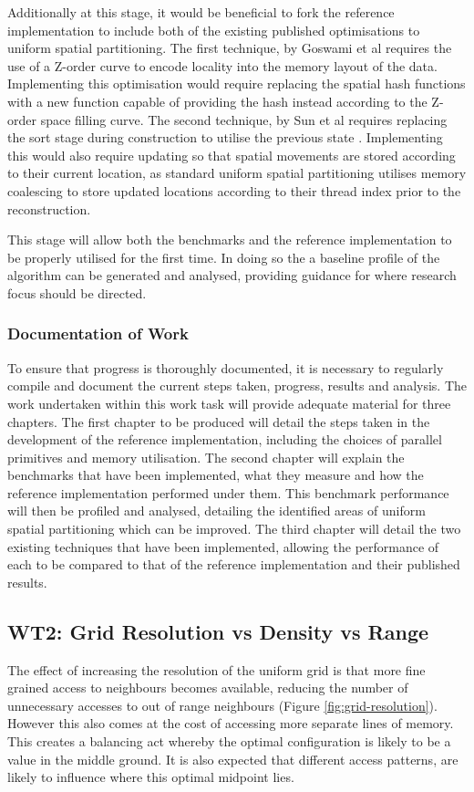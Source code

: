         Additionally at this stage, it would be beneficial to fork the reference implementation to include both of the existing published optimisations to uniform spatial partitioning. The first technique, by Goswami et al requires the use of a Z-order curve to encode locality into the memory layout of the data\cite{GS*10}. Implementing this optimisation would require replacing the spatial hash functions with a new function capable of providing the hash instead according to the Z-order space filling curve. The second technique, by Sun et al requires replacing the sort stage during construction to utilise the previous state \cite{HY*15}. Implementing this would also require updating so that spatial movements are stored according to their current location, as standard uniform spatial partitioning utilises memory coalescing to store updated locations according to their thread index prior to the reconstruction.
        
        This stage will allow both the benchmarks and the reference implementation to be properly utilised for the first time. In doing so the a baseline profile of the algorithm can be generated and analysed, providing guidance for where research focus should be directed.      
      
      \subsubsection*{Documentation of Work}
        To ensure that progress is thoroughly documented, it is necessary to regularly compile and document the current steps taken, progress, results and analysis. The work undertaken within this work task will provide adequate material for three chapters. The first chapter to be produced will detail the steps taken in the development of the reference implementation, including the choices of parallel primitives and memory utilisation. The second chapter will explain the benchmarks that have been implemented, what they measure and how the reference implementation performed under them. This benchmark performance will then be profiled and analysed, detailing the identified areas of uniform spatial partitioning which can be improved. The third chapter will detail the two existing techniques that have been implemented, allowing the performance of each to be compared to that of the reference implementation and their published results.
      
    \subsection{WT2: Grid Resolution vs Density vs Range}
      The effect of increasing the resolution of the uniform grid is that more fine grained access to neighbours becomes available, reducing the number of unnecessary accesses to out of range neighbours (Figure \ref{fig:grid-resolution}). However this also comes at the cost of accessing more separate lines of memory. This creates a balancing act whereby the optimal configuration is likely to be a value in the middle ground. It is also expected that different access patterns, are likely to influence where this optimal midpoint lies.
      
